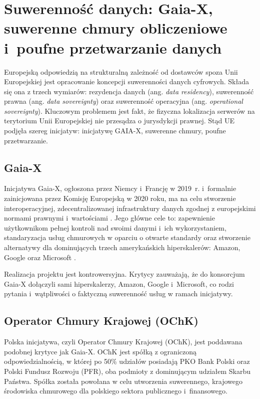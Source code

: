 \section{Suwerenność danych: Gaia-X, suwerenne chmury obliczeniowe i~poufne przetwarzanie danych}

Europejską odpowiedzią na strukturalną zależność od dostawców spoza Unii Europejskiej jest opracowanie koncepcji {suwerenności danych cyfrowych}. Składa się ona z trzech wymiarów: rezydencja danych (ang. \textit{data residency}), suwerenność prawna (ang. \textit{data sovereignty}) oraz  suwerenność operacyjna (ang. \textit{operational sovereignty}). Kluczowym problemem jest fakt, że
fizyczna lokalizacja serwerów na terytorium Unii Europejskiej nie przesądza o jurysdykcji  prawnej. Stąd UE podjęła szereg inicjatyw: inicjatywę GAIA-X, suwerenne chmury, poufne przetwarzanie.

\subsection*{Gaia-X}
Inicjatywa Gaia-X, ogłoszona przez Niemcy i~Francję w 2019~r. i~formalnie zainicjowana przez Komisję Europejską w 2020 roku, ma na celu stworzenie interoperacyjnej, zdecentralizowanej infrastruktury danych zgodnej z europejskimi normami prawnymi i~wartościami \autocite{braud2021gaiax}. Jego główne cele to: zapewnienie użytkownikom pełnej kontroli nad swoimi danymi i~ich wykorzystaniem, standaryzacja usług chmurowych w oparciu o otwarte standardy oraz
stworzenie alternatywy dla dominujących trzech amerykańskich hiperskalerów: Amazon, Google oraz Microsoft \autocite{braud2021gaiax}.

Realizacja projektu jest kontrowersyjna. Krytycy zauważają, że do konsorcjum Gaia-X dołączyli sami hiperskalerzy, Amazon, Google i~Microsoft, co rodzi pytania i~wątpliwości o faktyczną suwerenność usług w ramach inicjatywy.

\subsection*{Operator Chmury Krajowej (OChK)}
Polska inicjatywa, czyli Operator Chmury Krajowej (OChK), jest poddawana podobnej krytyce jak Gaia-X. OChK jest spółką z ograniczoną odpowiedzialnością, w której po 50\% udziałów posiadają PKO Bank Polski oraz Polski Fundusz Rozwoju (PFR), oba podmioty z dominującym udziałem Skarbu Państwa. Spółka została powołana w celu utworzenia suwerennego, krajowego środowiska chmurowego
dla polskiego sektora publicznego i~finansowego.

